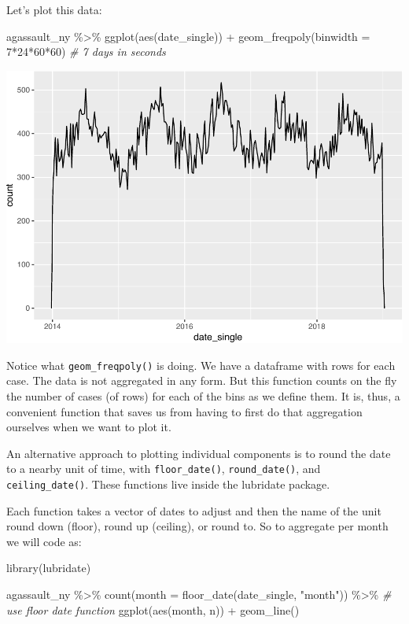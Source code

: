 \documentclass[
]{book}
\newenvironment{Shaded}{\begin{snugshade}}{\end{snugshade}}
\newcommand{\AttributeTok}[1]{\textcolor[rgb]{0.77,0.63,0.00}{#1}}
\newcommand{\CommentTok}[1]{\textcolor[rgb]{0.56,0.35,0.01}{\textit{#1}}}
\newcommand{\DecValTok}[1]{\textcolor[rgb]{0.00,0.00,0.81}{#1}}
\newcommand{\FunctionTok}[1]{\textcolor[rgb]{0.00,0.00,0.00}{#1}}
\newcommand{\NormalTok}[1]{#1}
\newcommand{\SpecialCharTok}[1]{\textcolor[rgb]{0.00,0.00,0.00}{#1}}
\newcommand{\StringTok}[1]{\textcolor[rgb]{0.31,0.60,0.02}{#1}}
\begin{document}
Let's plot this data:

\begin{Shaded}
\begin{Highlighting}[]
\NormalTok{agassault\_ny }\SpecialCharTok{\%\textgreater{}\%} 
  \FunctionTok{ggplot}\NormalTok{(}\FunctionTok{aes}\NormalTok{(date\_single)) }\SpecialCharTok{+} 
  \FunctionTok{geom\_freqpoly}\NormalTok{(}\AttributeTok{binwidth =} \DecValTok{7}\SpecialCharTok{*}\DecValTok{24}\SpecialCharTok{*}\DecValTok{60}\SpecialCharTok{*}\DecValTok{60}\NormalTok{) }\CommentTok{\# 7 days in seconds}
\end{Highlighting}
\end{Shaded}

\includegraphics{crime_mapping_files/figure-latex/ggplot_8b-1.pdf}

Notice what \texttt{geom\_freqpoly()} is doing. We have a dataframe with rows for each case. The data is not aggregated in any form. But this function counts on the fly the number of cases (of rows) for each of the bins as we define them. It is, thus, a convenient function that saves us from having to first do that aggregation ourselves when we want to plot it.

An alternative approach to plotting individual components is to round the date to a nearby unit of time, with \texttt{floor\_date()}, \texttt{round\_date()}, and \texttt{ceiling\_date()}. These functions live inside the lubridate package.

Each function takes a vector of dates to adjust and then the name of the unit round down (floor), round up (ceiling), or round to. So to aggregate per month we will code as:

\begin{Shaded}
\begin{Highlighting}[]
\FunctionTok{library}\NormalTok{(lubridate)}

\NormalTok{agassault\_ny }\SpecialCharTok{\%\textgreater{}\%} 
  \FunctionTok{count}\NormalTok{(}\AttributeTok{month =} \FunctionTok{floor\_date}\NormalTok{(date\_single, }\StringTok{"month"}\NormalTok{)) }\SpecialCharTok{\%\textgreater{}\%} \CommentTok{\# use floor date function}
  \FunctionTok{ggplot}\NormalTok{(}\FunctionTok{aes}\NormalTok{(month, n)) }\SpecialCharTok{+}
    \FunctionTok{geom\_line}\NormalTok{()}
\end{Highlighting}
\end{Shaded}
\end{document}
